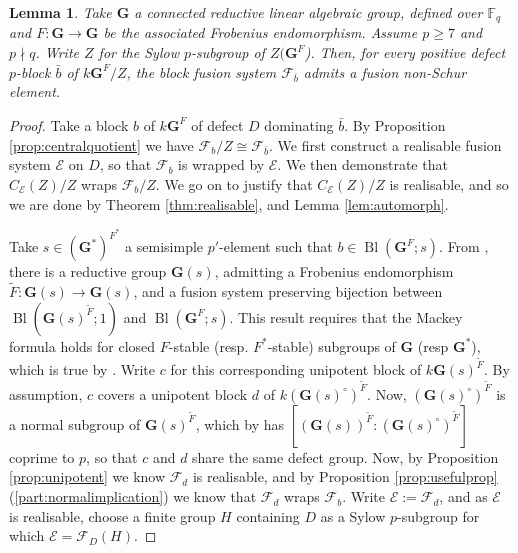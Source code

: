 \documentclass{amsart}
\theoremstyle{plain}\newtheorem{theorem}{Theorem}[section]
\theoremstyle{plain}\newtheorem{conjecture}[theorem]{Conjecture}
\theoremstyle{plain}\newtheorem{corollary}[theorem]{Corollary}
\theoremstyle{plain}\newtheorem{lemma}[theorem]{Lemma}
\theoremstyle{plain}\newtheorem{proposition}[theorem]{Proposition}
\theoremstyle{plain}\newtheorem{statement}[theorem]{}
\theoremstyle{definition}\newtheorem{definition}[theorem]{Definition}
\theoremstyle{definition}\newtheorem{example}[theorem]{Example}
\theoremstyle{definition}\newtheorem{examples}[theorem]{Examples}
\theoremstyle{definition}\newtheorem{notation}[theorem]{Notation}
\theoremstyle{definition}\newtheorem{remark}[theorem]{Remark}
\theoremstyle{definition}\newtheorem{remarks}[theorem]{Remarks}
\theoremstyle{definition}\newtheorem{question}[theorem]{Question}
\theoremstyle{definition}\newtheorem{propositiondefinition}[theorem]{Definition/Proposition}
\newcommand{\F}{\mathcal{F}}
\begin{document}
\begin{lemma}
	Take $\mathbf{G}$ a connected reductive linear algebraic group, defined over $\mathbb{F}_q$ and $F: \mathbf{G} \rightarrow \mathbf{G}$ be the associated Frobenius endomorphism.  Assume $p \geq 7$ and $p \nmid q$. Write $Z$ for the Sylow $p$-subgroup of $Z(\mathbf{G}^F$). Then, for every positive defect $p$-block $\bar{b}$ of $k\mathbf{G}^F/Z$, the block fusion system $\mathcal{F}_{\bar{b}}$ admits a fusion non-Schur element.
\end{lemma}
\begin{proof} 
	Take a block $b$ of $k\mathbf{G}^F$ of defect $D$ dominating $\bar{b}$. By Proposition \ref{prop:centralquotient} we have $\mathcal{F}_b/Z \cong \mathcal{F}_{\bar{b}}$. We first construct a realisable fusion system $\mathcal{E}$ on $D$, so that $\mathcal{F}_b$ is wrapped by $\mathcal{E}$. We then demonstrate that $C_\mathcal{E}(Z)/Z$ wraps $\mathcal{F}_b/Z$. We go on to justify that $C_\mathcal{E}(Z)/Z$ is realisable, and so we are done by Theorem \ref{thm:realisable}, and Lemma \ref{lem:automorph}.

	Take $s \in (\mathbf{G}^*)^{F^*}$ a semisimple $p'$-element such that $b \in \operatorname{Bl}(\mathbf{G}^F;s)$. From \cite[Theorem 1.4]{Enguehard}, there is a reductive group $\mathbf{G}(s)$, admitting a Frobenius endomorphism $\tilde{F}: \mathbf{G}(s) \rightarrow \mathbf{G}(s)$, and a fusion system preserving bijection between $\operatorname{Bl}(\mathbf{G}(s)^{\tilde{F}}; 1)$ and $\operatorname{Bl}(\mathbf{G}^F; s)$. This result requires that the Mackey formula holds for closed $F$-stable (resp. $F^*$-stable) subgroups of $\mathbf{G}$ (resp $\mathbf{G}^*$), which is true by \cite[Theorem 1.1]{Cotner}. Write $c$ for this corresponding unipotent block of $k\mathbf{G}(s)^{\tilde{F}}$. By assumption, $c$ covers a unipotent block $d$ of $k(\mathbf{G}(s)^\circ)^{\tilde{F}}$. Now, $(\mathbf{G}(s)^\circ)^{\tilde{F}}$ is a normal subgroup of $\mathbf{G}(s)^{\tilde{F}}$, which by \cite[Theorem 1.4(A), Proposition 1.2.4(a)]{Enguehard} has $[(\mathbf{G}(s))^{\tilde{F}}: (\mathbf{G}(s)^\circ)^{\tilde{F}}]$ coprime to $p$, so that $c$ and $d$ share the same defect group. Now, by Proposition \ref{prop:unipotent} we know $\mathcal{F}_d$ is realisable, and by Proposition \ref{prop:usefulprop}(\ref{part:normalimplication}) we know that $\mathcal{F}_d$ wraps $\mathcal{F}_b$. Write $\mathcal{E} :=\mathcal{F}_d$, and as $\mathcal{E}$ is realisable, choose a finite group $H$ containing $D$ as a Sylow $p$-subgroup for which $\mathcal{E} = \F_D(H)$. 


\end{proof}
\end{document}
